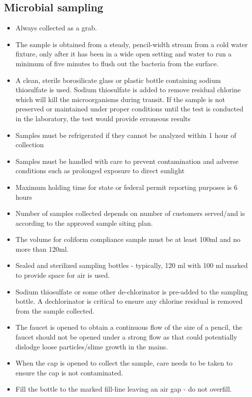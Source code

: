 \subsection{Microbial sampling}
\begin{itemize}
\item Always collected as a grab.
\item The sample is obtained from a steady, pencil-width stream from a cold water fixture, only after it has been in a wide open setting and  water to run a minimum of five minutes to flush out the bacteria from the surface. 
\item A clean, sterile borosilicate glass or plastic bottle containing sodium thiosulfate is used. Sodium thiosulfate is added to remove residual chlorine which will kill the microorganisms during transit. If the sample is not preserved or maintained under proper conditions until the test is conducted in the laboratory, the test would provide erroneous results
\item Samples must be refrigerated if they cannot be analyzed within 1 hour of collection
\item Samples must be handled with care to prevent contamination and adverse conditions such as prolonged exposure to direct sunlight
\item Maximum holding time for state or federal permit reporting purposes is 6 hours
\item Number of samples collected depends on number of customers served/and is according to the approved sample siting plan.
\item The volume for coliform compliance sample must be at least 100ml and no more than 120ml. 
\item Sealed and sterilized sampling bottles - typically, 120 ml with 100 ml marked to provide space for air is used.
\item Sodium thiosulfate or some other de-chlorinator is pre-added to the sampling bottle. A dechlorinator is critical to ensure any chlorine residual is removed from the sample collected.
\item The faucet is opened to obtain a continuous flow of the size of a pencil, the faucet should not be opened under a strong flow as  that could potentially dislodge loose particles/slime growth in the mains.
\item When the cap is opened to collect the sample, care needs to be taken to ensure the cap is not contaminated.
\item Fill the bottle to the marked fill-line leaving an air gap - do not overfill.

\end{itemize}
